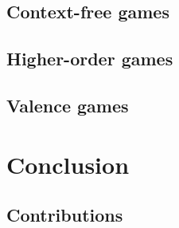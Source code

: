 \documentclass%
[%
    a4paper,                 %
    11pt,                    %
    parskip=half-,           %
    numbers=noenddot,        %
    twoside,                 %
    fleqn,                   %
    toc=chapterentrywithdots,%
    cleardoublepage=plain,   %
]
{style/smbook}
\begin{document}
    \chapter{Context-free games}%
    \label{Chapter:ContextFreeGames}%
    \chaptertoc%
        
        
        \clearpage
        
        \clearpage
        
        \clearpage
        
        \clearpage
        
        \clearpage
        
        \clearpage
        
        \clearpage
        
        \clearpage
        

    \chapter{Higher-order games}%
    \label{Chapter:HOGames}%
    \chaptertoc%
        
        
        \clearpage
        
        \clearpage
        
        \clearpage
        
        \clearpage
        

    \chapter{Valence games}%
    \label{Chapter:ValenceGames}%
    \chaptertoc%
        
        
        \clearpage
        
        \clearpage
        


\part{Conclusion}%
\label{Part:Conclusion}%

    \chapter{Contributions}%
    \label{Chapter:Contributions}%
    
\end{document}
